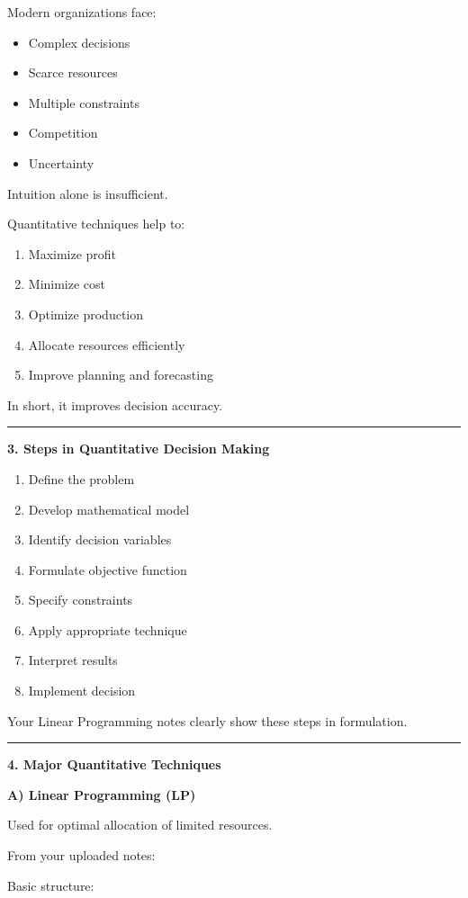 \documentclass[10pt,a4paper]{article}
\newcommand{\separator}{\vspace{0.4em}\noindent\rule{\linewidth}{0.6pt}\vspace{0.4em}}
\begin{document}
Modern organizations face:
\begin{itemize}
  \item Complex decisions
  \item Scarce resources
  \item Multiple constraints
  \item Competition
  \item Uncertainty
\end{itemize}

Intuition alone is insufficient.

Quantitative techniques help to:
\begin{enumerate}
  \item Maximize profit
  \item Minimize cost
  \item Optimize production
  \item Allocate resources efficiently
  \item Improve planning and forecasting
\end{enumerate}

In short, it improves decision accuracy.

\separator

\textbf{3. Steps in Quantitative Decision Making}

\begin{enumerate}
  \item Define the problem
  \item Develop mathematical model
  \item Identify decision variables
  \item Formulate objective function
  \item Specify constraints
  \item Apply appropriate technique
  \item Interpret results
  \item Implement decision
\end{enumerate}

Your Linear Programming notes clearly show these steps in formulation.

\separator

\textbf{4. Major Quantitative Techniques}

\textbf{A) Linear Programming (LP)}

Used for optimal allocation of limited resources.

From your uploaded notes:

Basic structure:
\end{document}

